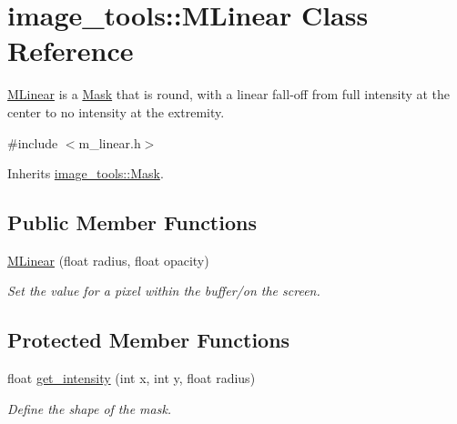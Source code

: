 \hypertarget{classimage__tools_1_1MLinear}{}\section{image\+\_\+tools\+:\+:M\+Linear Class Reference}
\label{classimage__tools_1_1MLinear}


\hyperlink{classimage__tools_1_1MLinear}{M\+Linear} is a \hyperlink{classimage__tools_1_1Mask}{Mask} that is round, with a linear fall-\/off from full intensity at the center to no intensity at the extremity.  




{\ttfamily \#include $<$m\+\_\+linear.\+h$>$}



Inherits \hyperlink{classimage__tools_1_1Mask}{image\+\_\+tools\+::\+Mask}.

\subsection*{Public Member Functions}
\begin{DoxyCompactItemize}
\item 
\hyperlink{classimage__tools_1_1MLinear_af84be097b93aaef6785f0ddb8a5af847}{M\+Linear} (float radius, float opacity)\hypertarget{classimage__tools_1_1MLinear_af84be097b93aaef6785f0ddb8a5af847}{}\label{classimage__tools_1_1MLinear_af84be097b93aaef6785f0ddb8a5af847}

\begin{DoxyCompactList}\small\item\em Set the value for a pixel within the buffer/on the screen. \end{DoxyCompactList}\end{DoxyCompactItemize}
\subsection*{Protected Member Functions}
\begin{DoxyCompactItemize}
\item 
float \hyperlink{classimage__tools_1_1MLinear_aeb72a91e48a0981a1e8f3754a17e174d}{get\+\_\+intensity} (int x, int y, float radius)
\begin{DoxyCompactList}\small\item\em Define the shape of the mask. \end{DoxyCompactList}\end{DoxyCompactItemize}


